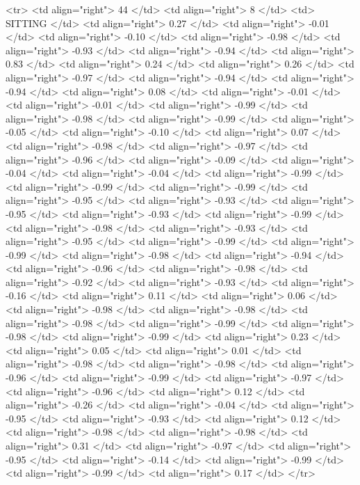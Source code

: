   <tr> <td align="right"> 44 </td> <td align="right">   8 </td> <td> SITTING </td> <td align="right"> 0.27 </td> <td align="right"> -0.01 </td> <td align="right"> -0.10 </td> <td align="right"> -0.98 </td> <td align="right"> -0.93 </td> <td align="right"> -0.94 </td> <td align="right"> 0.83 </td> <td align="right"> 0.24 </td> <td align="right"> 0.26 </td> <td align="right"> -0.97 </td> <td align="right"> -0.94 </td> <td align="right"> -0.94 </td> <td align="right"> 0.08 </td> <td align="right"> -0.01 </td> <td align="right"> -0.01 </td> <td align="right"> -0.99 </td> <td align="right"> -0.98 </td> <td align="right"> -0.99 </td> <td align="right"> -0.05 </td> <td align="right"> -0.10 </td> <td align="right"> 0.07 </td> <td align="right"> -0.98 </td> <td align="right"> -0.97 </td> <td align="right"> -0.96 </td> <td align="right"> -0.09 </td> <td align="right"> -0.04 </td> <td align="right"> -0.04 </td> <td align="right"> -0.99 </td> <td align="right"> -0.99 </td> <td align="right"> -0.99 </td> <td align="right"> -0.95 </td> <td align="right"> -0.93 </td> <td align="right"> -0.95 </td> <td align="right"> -0.93 </td> <td align="right"> -0.99 </td> <td align="right"> -0.98 </td> <td align="right"> -0.93 </td> <td align="right"> -0.95 </td> <td align="right"> -0.99 </td> <td align="right"> -0.99 </td> <td align="right"> -0.98 </td> <td align="right"> -0.94 </td> <td align="right"> -0.96 </td> <td align="right"> -0.98 </td> <td align="right"> -0.92 </td> <td align="right"> -0.93 </td> <td align="right"> -0.16 </td> <td align="right"> 0.11 </td> <td align="right"> 0.06 </td> <td align="right"> -0.98 </td> <td align="right"> -0.98 </td> <td align="right"> -0.98 </td> <td align="right"> -0.99 </td> <td align="right"> -0.98 </td> <td align="right"> -0.99 </td> <td align="right"> 0.23 </td> <td align="right"> 0.05 </td> <td align="right"> 0.01 </td> <td align="right"> -0.98 </td> <td align="right"> -0.98 </td> <td align="right"> -0.96 </td> <td align="right"> -0.99 </td> <td align="right"> -0.97 </td> <td align="right"> -0.96 </td> <td align="right"> 0.12 </td> <td align="right"> -0.26 </td> <td align="right"> -0.04 </td> <td align="right"> -0.95 </td> <td align="right"> -0.93 </td> <td align="right"> 0.12 </td> <td align="right"> -0.98 </td> <td align="right"> -0.98 </td> <td align="right"> 0.31 </td> <td align="right"> -0.97 </td> <td align="right"> -0.95 </td> <td align="right"> -0.14 </td> <td align="right"> -0.99 </td> <td align="right"> -0.99 </td> <td align="right"> 0.17 </td> </tr>
